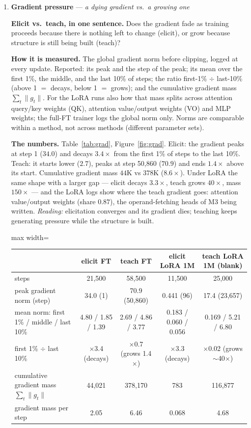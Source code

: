 \documentclass[11pt]{article}
\newcommand{\what}[1]{\par\noindent\textbf{Elicit vs.\ teach, in one sentence.} #1}
\newcommand{\how}[1]{\par\noindent\textbf{How it is measured.} #1}
\newcommand{\numbers}[1]{\par\noindent\textbf{The numbers.} #1\par\medskip}
\newcommand{\metricsec}[2]{\item \textbf{#1} --- \emph{#2}}
\begin{document}
\begin{enumerate}[label=\textbf{M\arabic*}, leftmargin=*, itemsep=1.2em, resume]
\metricsec{Gradient pressure}{a dying gradient vs.\ a growing one}
\what{Does the gradient fade as training proceeds because there is nothing left to change
(elicit), or grow because structure is still being built (teach)?}
\how{The global gradient norm before clipping, logged at every update. Reported: its peak and
the step of the peak; its mean over the first 1\%, the middle, and the last 10\% of steps; the
ratio first-1\% $\div$ last-10\% (above 1 $=$ decays, below 1 $=$ grows); and the cumulative
gradient mass $\sum_t\|g_t\|$. For the LoRA runs also how that mass splits across attention
query/key weights (QK), attention value/output weights (VO) and MLP weights; the full-FT trainer
logs the global norm only. Norms are comparable within a method, not across methods (different
parameter sets).}
\numbers{Table~\ref{tab:grad}, Figure~\ref{fig:grad}. Elicit: the gradient peaks at step 1
($34.0$) and decays $3.4\times$ from the first 1\% of steps to the last 10\%. Teach: it starts
lower ($2.7$), peaks at step 50,860 ($70.9$) and ends $1.4\times$ above its start. Cumulative
gradient mass $44$K vs $378$K ($8.6\times$). Under LoRA the same shape with a larger gap ---
elicit decays $3.3\times$, teach grows $40\times$, mass $150\times$ --- and the LoRA logs show where
the teach gradient goes: attention value/output weights (share $0.87$), the operand-fetching
heads of M3 being written. \emph{Reading:} elicitation converges and its gradient dies; teaching
keeps generating pressure while the structure is built.}
\begin{table}[h]\centering\small
\begin{adjustbox}{max width=\textwidth}
\begin{tabular}{lcccc}
\toprule
 & \textbf{elicit FT} & \textbf{teach FT} & elicit LoRA 1M & teach LoRA 1M (blank) \\
\midrule
steps & 21{,}500 & 58{,}500 & 11{,}500 & 25{,}000 \\
peak gradient norm (step) & 34.0 (1) & 70.9 (50{,}860) & 0.441 (96) & 17.4 (23{,}657) \\
mean norm: first 1\% / middle / last 10\% & 4.80 / 1.85 / 1.39 & 2.69 / 4.86 / 3.77 & 0.183 / 0.060 / 0.056 & 0.169 / 5.21 / 6.80 \\
first 1\% $\div$ last 10\% & $\times$3.4 (decays) & $\times$0.7 (grows 1.4$\times$) & $\times$3.3 (decays) & $\times$0.02 (grows $\sim$40$\times$) \\
cumulative gradient mass $\sum_t\|g_t\|$ & 44{,}021 & 378{,}170 & 783 & 116{,}877 \\
gradient mass per step & 2.05 & 6.46 & 0.068 & 4.68 \\

\end{tabular}
\end{adjustbox}
\end{table}
\end{enumerate}
\end{document}

